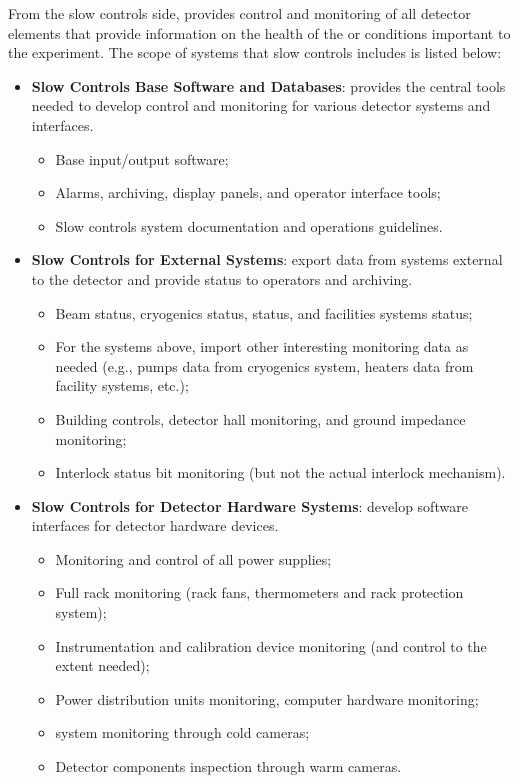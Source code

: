From the slow controls side,   provides control and monitoring of
all detector elements that provide information on the health of the
 or conditions important to the experiment.
The scope of systems that slow controls includes is listed below:

\begin{itemize}
\item {\bf Slow Controls Base Software and Databases}: provides the central tools needed to develop control and monitoring for various detector systems and interfaces.
  \begin{itemize}
  \item Base input/output software;
  \item Alarms, archiving, display panels, and operator interface tools; 
  \item Slow controls system documentation and operations guidelines.
  \end{itemize}
\item {\bf Slow Controls for External Systems}: export data from systems external to the detector and provide status to operators and archiving.
  \begin{itemize}
  \item Beam status, cryogenics status,  status, and facilities systems status;
  \item For the systems above, import other interesting monitoring data as needed (e.g., pumps data from cryogenics system, heaters data from facility systems, etc.);
  \item Building controls, detector hall monitoring, and ground impedance monitoring; 
  \item Interlock status bit monitoring (but not the actual interlock mechanism).
  \end{itemize}
\item {\bf Slow Controls for Detector Hardware Systems}: develop software interfaces for detector hardware devices.
  \begin{itemize}
  \item Monitoring and control of all power supplies; 
  \item Full rack monitoring (rack fans, thermometers and rack protection system);
  \item Instrumentation and calibration device monitoring (and control to the extent needed);
  \item Power distribution units monitoring, computer hardware monitoring;
  \item {} system monitoring through cold cameras;
  \item Detector components inspection through warm cameras.
  \end{itemize}
\end{itemize}

